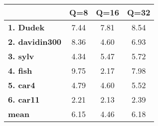 \begin{tabular}{|l|c|c|c|}
\hline
&\textbf{Q=8}&\textbf{Q=16}&\textbf{Q=32}\\\hline
\textbf{1. Dudek}&7.44&7.81&8.54\\\hline
\textbf{2. davidin300}&8.36&4.60&6.93\\\hline
\textbf{3. sylv}&4.34&5.47&5.72\\\hline
\textbf{4. fish}&9.75&2.17&7.98\\\hline
\textbf{5. car4}&4.79&4.60&5.52\\\hline
\textbf{6. car11}&2.21&2.13&2.39\\\hline
\textbf{mean}&6.15&4.46&6.18\\\hline
\end{tabular}

